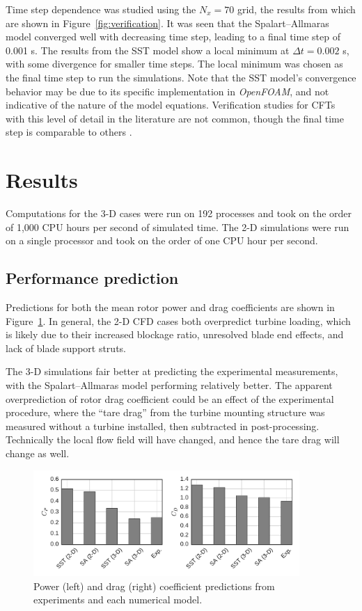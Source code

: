 \documentclass[aip,graphicx]{revtex4-1}
\begin{document}
Time step dependence was studied using the $N_x=70$ grid, the results from which
are shown in Figure~\ref{fig:verification}. It was seen that the
Spalart--Allmaras model converged well with decreasing time step, leading to a
final time step of 0.001 s. The results from the SST model show a local minimum
at $\Delta t = 0.002$ s, with some divergence for smaller time steps. The local
minimum was chosen as the final time step to run the simulations. Note that the
SST model's convergence behavior may be due to its specific implementation in
\textit{OpenFOAM}, and not indicative of the nature of the model equations.
Verification studies for CFTs with this level of detail in the literature are
not common, though the final time step is comparable to others
\cite{Balduzzi2016}.


\section{Results}

Computations for the 3-D cases were run on 192 processes and took on the order
of 1,000 CPU hours per second of simulated time. The 2-D simulations were run on
a single processor and took on the order of one CPU hour per second.


\subsection{Performance prediction}

Predictions for both the mean rotor power and drag coefficients are shown in
Figure~\ref{fig:perf-comp}. In general, the 2-D CFD cases both overpredict
turbine loading, which is likely due to their increased blockage ratio,
unresolved blade end effects, and lack of blade support struts.

The 3-D simulations fair better at predicting the experimental measurements,
with the Spalart--Allmaras model performing relatively better. The apparent
overprediction of rotor drag coefficient could be an effect of the experimental
procedure, where the ``tare drag'' from the turbine mounting structure was
measured without a turbine installed, then subtracted in post-processing.
Technically the local flow field will have changed, and hence the tare drag will
change as well.

\begin{figure}[ht]
    \centering

    \includegraphics[width=0.9\textwidth]{figures/perf_bar_chart}

    \caption{Power (left) and drag (right) coefficient predictions from
        experiments and each numerical model.}

    \label{fig:perf-comp}
\end{figure}
\end{document}
